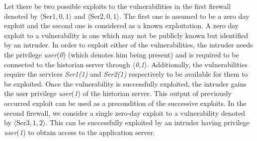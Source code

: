 Let there be two possible exploits to the vulnerabilities in the first firewall denoted by $\langle\textrm{Ser}1,0,1\rangle$ and $\langle\textrm{Ser}2,0,1\rangle$. The first one is assumed to be a zero day exploit and the second one is considered as a known exploitation. A zero day exploit to a vulnerability is one which may not be publicly known but identified by an intruder. In order to exploit either of the vulnerabilities, the intruder needs the privilege \emph{user}(\emph{0}) (which denotes him being present) and is required to be connected to the historian server through $\langle$\emph{0},\emph{1}$\rangle$. Additionally, the vulnerabilities require the services \emph{Ser1(1)} and \emph{Ser2(1)} respectively to be available for them to be exploited. Once the vulnerability is successfully exploited, the intruder gains the user privilege \emph{user}(\emph{1}) of the historian server. This output of previously occurred exploit can be used as a precondition of the successive exploits. In the second firewall, we consider a single zero-day exploit to a vulnerability denoted by $\langle\textrm{Ser}3,1,2\rangle$. This can be successfully exploited by an intruder having privilege \emph{user}(\emph{1}) to obtain access to the application server.

